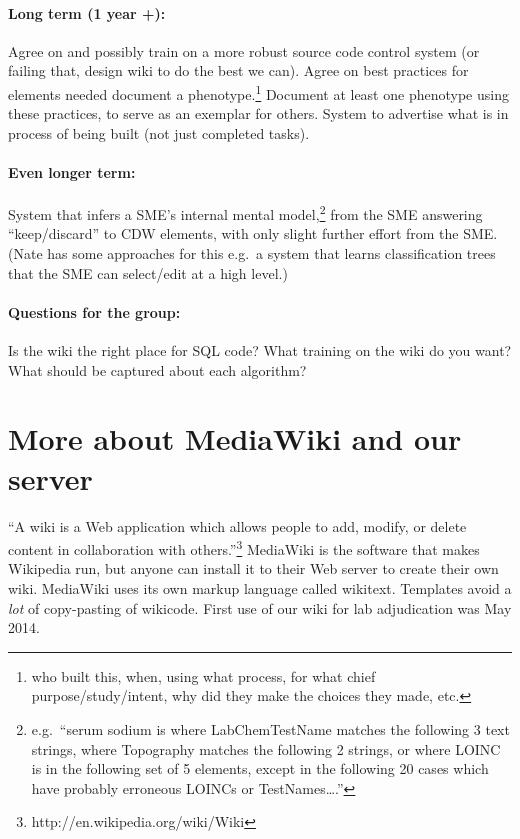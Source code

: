 \documentclass{tufte-handout}
\begin{document}
\paragraph{Long term (1 year +):} Agree on and possibly train on a more robust source code control
system (or failing that, design wiki to do the best we can). Agree on
best practices for elements needed document a phenotype.\footnote{who built
this, when, using what process, for what chief purpose/study/intent,
why did they make the choices they made, etc.} Document at least one
phenotype using these practices, to serve as an exemplar for others.
System to advertise what is in process of being built (not just
completed tasks).

\paragraph{Even longer term:} System that infers a SME's internal mental model,\footnote{e.g.\ ``serum sodium
is where LabChemTestName matches the following 3 text strings, where
Topography matches the following 2 strings, or where LOINC is in the
following set of 5 elements, except in the following 20 cases which
have probably erroneous LOINCs or TestNames\ldots{}.''} from the SME
answering ``keep/discard'' to CDW elements, with only slight further
effort from the SME. (Nate has some approaches for this e.g.\ a system
that learns classification trees that the SME can select/edit at a
high level.)

\paragraph{Questions for the group:} Is the wiki the right place for
SQL code? What training on the wiki do you want? What should be
captured about each algorithm?


\section{More about MediaWiki and our server}

``A wiki is a Web application which allows people to add, modify, or
delete content in collaboration with
others.''\footnote{http://en.wikipedia.org/wiki/Wiki} MediaWiki is the
software that makes Wikipedia run, but anyone can install it to their
Web server to create their own wiki. MediaWiki uses its own markup
language called wikitext. Templates avoid a \emph{lot} of copy-pasting
of wikicode. First use of our wiki for lab adjudication was May 2014.

\end{document}
